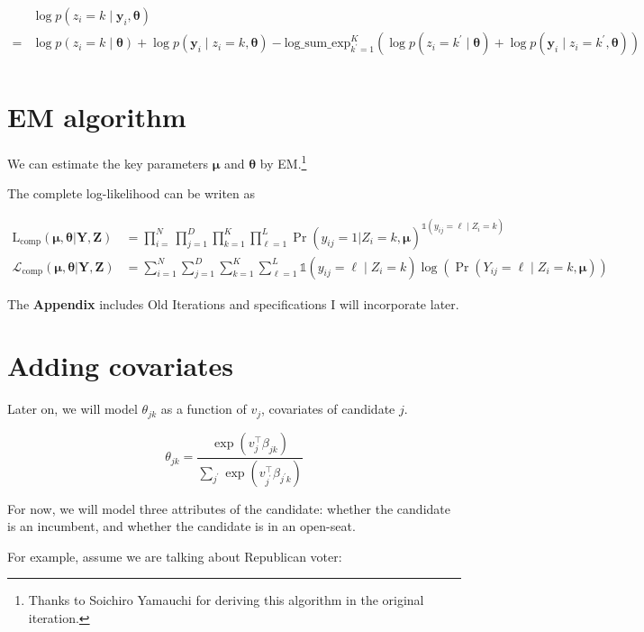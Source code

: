\documentclass[12pt,letterpaper]{article}
\numberwithin{equation}{section}
\newcommand{\bth}{\bm{\theta}}
\newcommand{\bmu}{\bm{\mu}}
\newcommand{\by}{\mathbf{y}}
\newcommand{\bY}{\mathbf{Y}}
\newcommand{\bZ}{\mathbf{Z}}
\begin{document}
\begin{align*}
&\log p(z_i = k \mid \by_{i}, \bth)\\
=& \log p(z_i = k \mid \bth) + \log p(\by_i \mid z_i = k,  \bth)   - \mathrm{log\_sum\_exp}_{k^\prime = 1}^K\left(\log p(z_i = k^\prime \mid \bth) + \log p(\by_i \mid z_i = k^\prime, \bth)\right)\\
\end{align*}

\pagebreak

\section{EM algorithm}

We can estimate the key parameters \(\bmu\) and \(\bth\) by
EM.\footnote{Thanks to Soichiro Yamauchi for deriving this algorithm in the original iteration.}

The complete log-likelihood can be writen as

\begin{align}
\text{L}_{\text{comp}}(\bmu, \bth | \bY, \bZ) &= \prod^{N}_{i=}\prod^{D}_{j=1}\prod^{K}_{k = 1}\prod^L_{\ell = 1}\Pr(y_{ij}=  1 | Z_i = k, \bmu)^{\mathds{1}(y_{ij} = \ell \mid Z_i = k)}\\
\mathcal{L}_{\mathrm{comp}}(\bmu, \bth | \bY, \bZ) &= \sum^{N}_{i=1}\sum^{D}_{j=1}\sum^{K}_{k = 1}\sum^L_{\ell = 1}{\mathds{1}(y_{ij} = \ell \mid Z_i = k)}\log(\Pr(Y_{ij} = \ell \mid Z_i = k, \bmu))
\end{align}

\pagebreak

\appendix

The \textbf{Appendix} includes Old Iterations and specifications I will
incorporate later.

\section{Adding covariates}

Later on, we will model \(\theta_{jk}\) as a function of \(v_{j}\),
covariates of candidate \(j\).

\[\theta_{jk} = \frac{\exp(v_{j}^{\top}\beta_{jk})}{\sum_{j^{\prime}} \exp(v_{j^{\prime}}^{\top}\beta_{j^{\prime}k})} \]

For now, we will model three attributes of the candidate: whether the
candidate is an incumbent, and whether the candidate is in an open-seat.

For example, assume we are talking about Republican voter:
\end{document}
